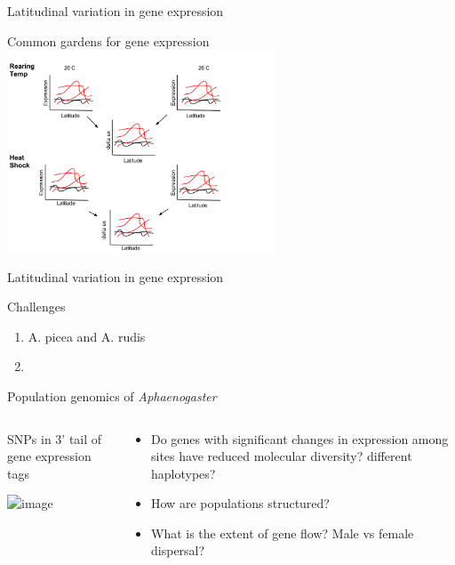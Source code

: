 \documentclass{beamer}
\begin{document}
\begin{frame}{Latitudinal variation in gene expression}
	\begin{center}
		\large{Common gardens for gene expression}
		\includegraphics[width=8cm]{Latitudinal_gene_expression.png}\\
	\end{center}
\end{frame}


\begin{frame}{Latitudinal variation in gene expression}
	\begin{block}{Challenges}
		\begin{enumerate}
			\item A. picea and A. rudis
			\item 
		\end{enumerate}
	\end{block}
\end{frame}


\begin{frame}{Population genomics of \textit{Aphaenogaster}}
	\begin{columns}
		\begin{column}{5cm}

			SNPs in 3' tail of gene expression tags
			\vspace{1cm}

			\includegraphics<1>[width=5cm]{ovation_DGE.png}\\
		\end{column}
		\begin{column}{5cm}
			\begin{center}
				\begin{itemize}
					\item Do genes with significant changes in expression among sites have reduced molecular diversity? different haplotypes?
					\item How are populations structured?
					\item What is the extent of gene flow? Male vs female dispersal?
				\end{itemize}
			\end{center}
		\end{column}
	\end{columns}
\end{frame}
\end{document}
